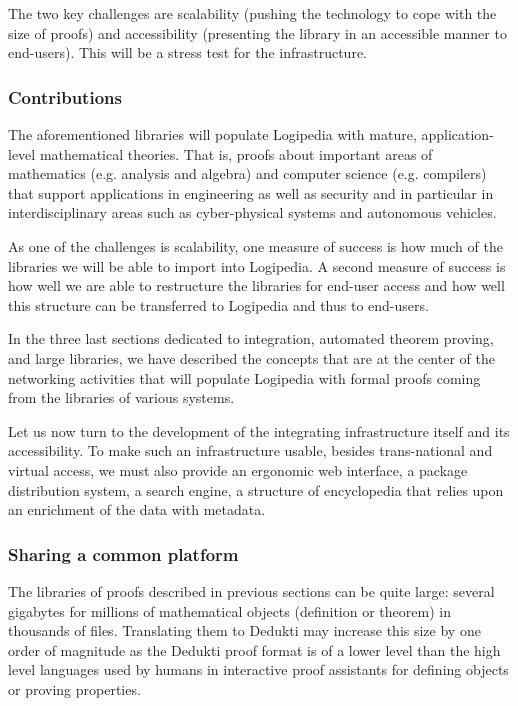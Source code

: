 The two key challenges are scalability (pushing the technology to cope
with the size of proofs) and accessibility (presenting the library in
an accessible manner to end-users). This will be a stress test for the
infrastructure.

\subsubsection*{Contributions}

The aforementioned libraries will populate Logipedia with mature,
application-level mathematical theories. That is, proofs about
important areas of mathematics (e.g. analysis and algebra) and
computer science (e.g. compilers) that support applications in
engineering as well as security and in particular in interdisciplinary
areas such as cyber-physical systems and autonomous vehicles.

As one of the challenges is scalability, one measure of success is how
much of the libraries we will be able to import into Logipedia. A
second measure of success is how well we are able to restructure the
libraries for end-user access and how well this structure can be
transferred to Logipedia and thus to end-users.


In the three last sections dedicated to integration, automated theorem
proving, and large libraries, we have described the concepts that are
at the center of the networking activities that will populate
Logipedia with formal proofs coming from the libraries of various
systems.

Let us now turn to the development of the integrating infrastructure
itself and its accessibility.
To make such an infrastructure
usable, besides trans-national and virtual access,
we must also provide an ergonomic web interface, a package
distribution system, a search engine, a structure of encyclopedia
that relies upon an enrichment of the data with metadata.

\subsubsection*{Sharing a common platform}

The libraries of proofs described in previous sections can be quite
large: several gigabytes for millions of mathematical objects
(definition or theorem) in thousands of files. Translating them to
Dedukti may increase this size by one order of magnitude as the
Dedukti proof format is of a lower level than the high level languages
used by humans in interactive proof assistants for defining objects or
proving properties.

